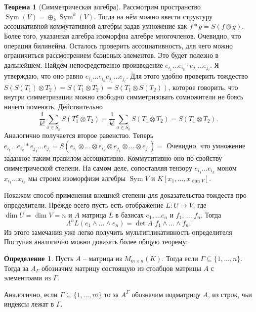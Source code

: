 \documentclass[10pt,a4paper,oneside]{book}
\theoremstyle{definition}
\newtheorem*{defn}{{\color{yellow!30!red} Определение}}
\newtheorem{thm}{{\color{red!40!black} Теорема}}
\newcommand{\Sym}{\operatorname{Sym}}
\def\thrm{\begin{thm}}
\def\ethrm{\end{thm}}
\def\dfn{\begin{defn}}
\def\edfn{\end{defn}}
\begin{document}
\thrm[Симметрическая алгебра] Рассмотрим пространство $\Sym(V)=\oplus_k \Sym^k(V)$. Тогда на нём можно ввести структуру ассоциативной коммутативной алгебры задав умножение как $ f*g= S(f\otimes g)$. Более того, указанная алгебра изоморфна алгебре многочленов.
\proof Очевидно, что операция билинейна. Осталось проверить ассоциативность, для чего можно ограничиться рассмотрением базисных элементов. Это будет полезно в дальнейшем. Найдём непосредственно произведение $e_{i_1}\dots e_{i_k}\cdot e_{j_1}\dots e_{j_l}$. Я утверждаю, что оно равно $e_{i_1}\dots e_{i_k} e_{j_1}\dots e_{j_l}$.
Для этого удобно проверить тождество $S(S(T_1)\otimes T_2)= S(T_1\otimes T_2)= S(T_1 \otimes S(T_2))$, которое говорить, что внутри симметризации можно свободно симметризовать сомножители не боясь ничего поменять. Действительно
$$\frac{1}{k!}\sum_{\sigma \in S_{k}} S(T_1^{\sigma}\otimes T_2)=\frac{1}{k!}\sum_{\sigma \in S_{k}} S(T_1\otimes T_2)=S(T_1 \otimes T_2).$$
Аналогично получается второе равенство.
Теперь $e_{i_1}\dots e_{i_k} *  e_{j_1}\dots e_{j_l}= S(e_{i_1}\otimes\dots \otimes e_{i_k}\otimes e_{j_1}\otimes \dots\otimes e_{j_l})=$
Очевидно, что умножение заданное таким правилом ассоциативно. Коммутитивно оно по свойству симметрической степени. На самом деле, сопоставляя тензору $e_{i_1}\dots e_{i_k}$ моном $x_{i_1}\dots x_{i_k}$ мы строим изоморфизм алгебры $\Sym V$ и $K[x_1,\dots,x_{\dim V}]$.
\endproof
\ethrm




Покажем способ применения внешней степени для доказательства тождеств про определители. Прежде всего пусть есть отображение $L \colon U \to V$, где $\dim U= \dim V = n$ и $A$ матрица $L$ в базисах $e_1,\dots e_n$ и $f_1,\dots,f_n$. Тогда $$\Lambda^n L(e_1\wedge \dots \wedge e_n) = \det A \,\,f_1 \wedge \dots \wedge f_n.$$
Из этого замечания уже легко получить мультипликативность определителя. Поступая аналогично можно доказать более общую теорему:

\dfn Пусть $A$ -- матрица из $M_{m\times n}(K)$. Тогда если $\Gamma \subseteq \{1,\dots,n\}$. Тогда за $A_{\Gamma}$ обозначим матрицу состоящую из столбцов матрицы $A$ с элементоами из $\Gamma$.

Аналогично, если $\Gamma \subseteq \{1,\dots,m\}$ то за $A^{\Gamma}$ обозначим подматрицу $A$, из строк, чьи индексы лежат в $\Gamma$.
\edfn
\end{document}
